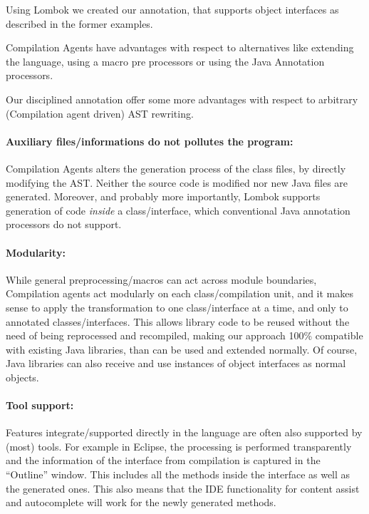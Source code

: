 Using Lombok we created our \mixin annotation, that supports object
interfaces as described in the former examples.
 
Compilation Agents have advantages with respect to
alternatives like extending the language, using a macro pre processors 
or using the Java Annotation processors.

Our disciplined \mixin annotation offer some more advantages with respect to arbitrary (Compilation agent driven) AST rewriting.


\paragraph{Auxiliary files/informations do not pollutes the program:}
Compilation Agents alters the generation process of the class files,
by directly modifying the AST.
Neither the source code is modified nor new Java files are generated.
Moreover, and probably more importantly, Lombok supports generation of
  code \emph{inside} a class/interface, which conventional
  Java annotation processors do not support.

\paragraph{Modularity:}
While general preprocessing/macros can act across module boundaries,
Compilation agents act modularly on each class/compilation unit, and it makes
sense to apply the transformation to one class/interface at a time, and only to annotated classes/interfaces.
This allows library code to be reused without the need of being
reprocessed and recompiled, making our approach 100\% compatible with existing Java libraries, than can be used 
and extended normally. Of course, Java libraries can also receive and use instances of object interfaces as normal objects.

\paragraph{Tool support:}
Features integrate/supported directly in the language are often also supported by (most) tools.
For example in Eclipse, the processing is performed transparently and the information of
the interface from compilation is captured in the ``Outline'' window. This includes
all the methods inside the interface as well as the generated ones.  
This also means that the IDE functionality for content assist and autocomplete
will work for the newly generated methods.


